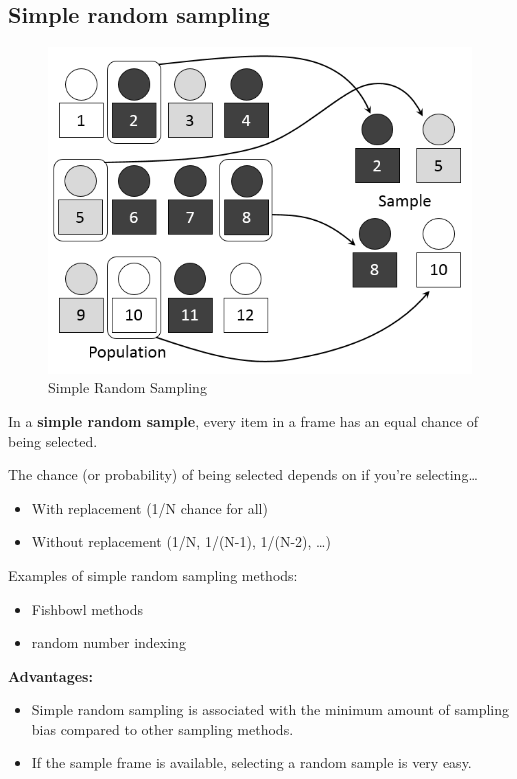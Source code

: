 \documentclass[
]{book}
\providecommand{\tightlist}{%
  \setlength{\itemsep}{0pt}\setlength{\parskip}{0pt}}
\begin{document}
\subsection{Simple random sampling}\label{simple-random-sampling}

\begin{figure}

{\centering \includegraphics[width=0.5\linewidth]{images/random} 

}

\caption{Simple Random Sampling}\label{fig:unnamed-chunk-22}
\end{figure}

In a \textbf{simple random sample}, every item in a frame has an equal chance of being selected.

The chance (or probability) of being selected depends on if you're selecting\ldots{}

\begin{itemize}
\tightlist
\item
  With replacement (1/N chance for all)
\item
  Without replacement (1/N, 1/(N-1), 1/(N-2), \ldots)
\end{itemize}

Examples of simple random sampling methods:

\begin{itemize}
\tightlist
\item
  Fishbowl methods
\item
  random number indexing
\end{itemize}

\textbf{Advantages:}

\begin{itemize}
\item
  Simple random sampling is associated with the minimum amount of sampling bias compared to other sampling methods.
\item
  If the sample frame is available, selecting a random sample is very easy.
\end{itemize}
\end{document}
